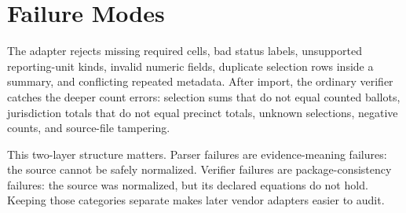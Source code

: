 \section{Failure Modes}

The adapter rejects missing required cells, bad status labels, unsupported
reporting-unit kinds, invalid numeric fields, duplicate selection rows inside a
summary, and conflicting repeated metadata. After import, the ordinary verifier
catches the deeper count errors: selection sums that do not equal counted
ballots, jurisdiction totals that do not equal precinct totals, unknown
selections, negative counts, and source-file tampering.

This two-layer structure matters. Parser failures are evidence-meaning failures:
the source cannot be safely normalized. Verifier failures are package-consistency
failures: the source was normalized, but its declared equations do not hold.
Keeping those categories separate makes later vendor adapters easier to audit.
